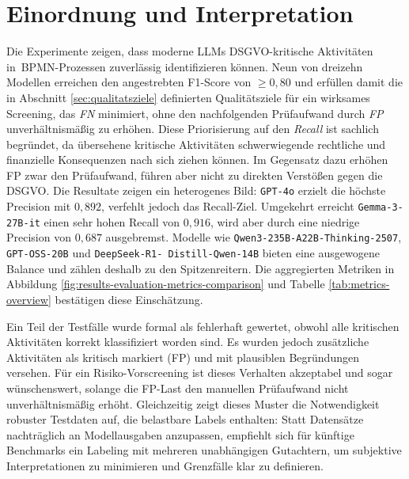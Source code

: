 \section{Einordnung und Interpretation}\label{sec:einordnung-und-interpretation}

Die Experimente zeigen, dass moderne \acp{LLM} \ac{DSGVO}-kritische Aktivitäten in\linebreak~\ac{BPMN}-Prozessen zuverlässig identifizieren können. Neun von dreizehn Modellen erreichen den angestrebten F1-Score von $\geq 0{,}80$ und erfüllen damit die in Abschnitt \ref{sec:qualitatsziele} definierten Qualitätsziele für ein wirksames Screening, das \emph{\ac{FN}} minimiert, ohne den nachfolgenden Prüfaufwand durch \emph{\ac{FP}} unverhältnismäßig zu erhöhen. Diese Priorisierung auf den \emph{Recall} ist sachlich begründet, da übersehene kritische Aktivitäten schwerwiegende rechtliche und finanzielle Konsequenzen nach sich ziehen können. Im Gegensatz dazu erhöhen \ac{FP} zwar den Prüfaufwand, führen aber nicht zu direkten Verstößen gegen die \ac{DSGVO}. Die Resultate zeigen ein heterogenes Bild: \texttt{GPT-4o} erzielt die höchste Precision mit $0{,}892$, verfehlt jedoch das Recall-Ziel. Umgekehrt erreicht \texttt{Gemma-3-27B-it} einen sehr hohen Recall von $0{,}916$, wird aber durch eine niedrige Precision von $0{,}687$ ausgebremst. Modelle wie \texttt{Qwen3-235B-A22B-Thinking-2507}, \texttt{GPT-OSS-20B} und \texttt{DeepSeek-R1-\linebreak~Distill-Qwen-14B} bieten eine ausgewogene Balance und zählen deshalb zu den Spitzenreitern. Die aggregierten Metriken in Abbildung \ref{fig:results-evaluation-metrics-comparison} und Tabelle \ref{tab:metrics-overview} bestätigen diese Einschätzung.

Ein Teil der Testfälle wurde formal als fehlerhaft gewertet, obwohl alle kritischen Aktivitäten korrekt klassifiziert worden sind. Es wurden jedoch zusätzliche Aktivitäten als kritisch markiert (\ac{FP}) und mit plausiblen Begründungen versehen. Für ein Risiko-Vorscreening ist dieses Verhalten akzeptabel und sogar wünschenswert, solange die \ac{FP}-Last den manuellen Prüfaufwand nicht unverhältnismäßig erhöht. Gleichzeitig zeigt dieses Muster die Notwendigkeit robuster Testdaten auf, die belastbare Labels enthalten: Statt Datensätze nachträglich an Modellausgaben anzupassen, empfiehlt sich für künftige Benchmarks ein Labeling mit mehreren unabhängigen Gutachtern, um subjektive Interpretationen zu minimieren und Grenzfälle klar zu definieren.